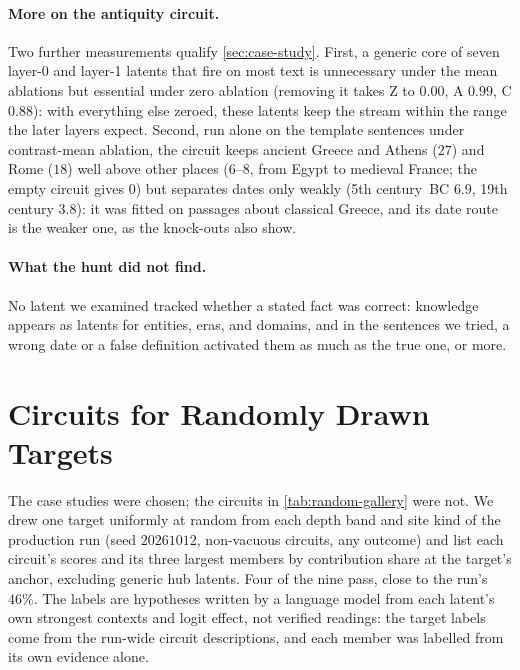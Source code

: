 \documentclass[10pt]{article}
\begin{document}
\paragraph{More on the antiquity circuit.}
Two further measurements qualify \cref{sec:case-study}.
First, a generic core of seven layer-0 and layer-1 latents that fire on most text is unnecessary under the mean ablations but essential under zero ablation (removing it takes Z to $0.00$, A $0.99$, C $0.88$): with everything else zeroed, these latents keep the stream within the range the later layers expect.
Second, run alone on the template sentences under contrast-mean ablation, the circuit keeps ancient Greece and Athens ($27$) and Rome ($18$) well above other places ($6$--$8$, from Egypt to medieval France; the empty circuit gives $0$) but separates dates only weakly (5th century~BC $6.9$, 19th century $3.8$): it was fitted on passages about classical Greece, and its date route is the weaker one, as the knock-outs also show.

\paragraph{What the hunt did not find.}
No latent we examined tracked whether a stated fact was correct: knowledge appears as latents for entities, eras, and domains, and in the sentences we tried, a wrong date or a false definition activated them as much as the true one, or more.

\section{Circuits for Randomly Drawn Targets}
\label{app:random-gallery}
The case studies were chosen; the circuits in \cref{tab:random-gallery} were not.
We drew one target uniformly at random from each depth band and site kind of the production run (seed $20261012$, non-vacuous circuits, any outcome) and list each circuit's scores and its three largest members by contribution share at the target's anchor, excluding generic hub latents.
Four of the nine pass, close to the run's $46\%$.
The labels are hypotheses written by a language model from each latent's own strongest contexts and logit effect, not verified readings: the target labels come from the run-wide circuit descriptions, and each member was labelled from its own evidence alone.
\end{document}
